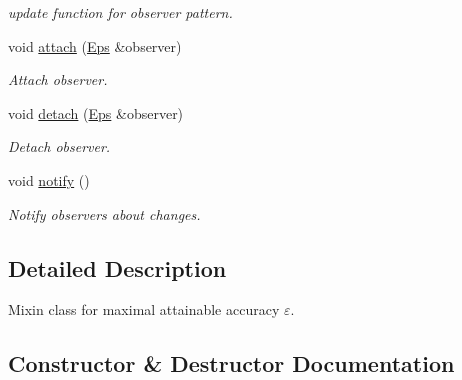 \begin{DoxyCompactItemize}
\begin{DoxyCompactList}\small\item\em update function for observer pattern. \end{DoxyCompactList}\item 
void \hyperlink{classSpacy_1_1Mixin_1_1MixinConnection_abb5520ee6b22dd993d78f142939a1ed4}{attach} (\hyperlink{classSpacy_1_1Mixin_1_1Eps}{Eps} \&observer)\hypertarget{classSpacy_1_1Mixin_1_1MixinConnection_abb5520ee6b22dd993d78f142939a1ed4}{}\label{classSpacy_1_1Mixin_1_1MixinConnection_abb5520ee6b22dd993d78f142939a1ed4}

\begin{DoxyCompactList}\small\item\em Attach observer. \end{DoxyCompactList}\item 
void \hyperlink{classSpacy_1_1Mixin_1_1MixinConnection_adda739590c487679c26f60e50aedb73f}{detach} (\hyperlink{classSpacy_1_1Mixin_1_1Eps}{Eps} \&observer)\hypertarget{classSpacy_1_1Mixin_1_1MixinConnection_adda739590c487679c26f60e50aedb73f}{}\label{classSpacy_1_1Mixin_1_1MixinConnection_adda739590c487679c26f60e50aedb73f}

\begin{DoxyCompactList}\small\item\em Detach observer. \end{DoxyCompactList}\item 
void \hyperlink{classSpacy_1_1Mixin_1_1MixinConnection_a1ddeaa78a3bb4a38c2cca36d1f99fe36}{notify} ()\hypertarget{classSpacy_1_1Mixin_1_1MixinConnection_a1ddeaa78a3bb4a38c2cca36d1f99fe36}{}\label{classSpacy_1_1Mixin_1_1MixinConnection_a1ddeaa78a3bb4a38c2cca36d1f99fe36}

\begin{DoxyCompactList}\small\item\em Notify observers about changes. \end{DoxyCompactList}\end{DoxyCompactItemize}


\subsection{Detailed Description}
Mixin class for maximal attainable accuracy $\varepsilon$. 

\subsection{Constructor \& Destructor Documentation}
